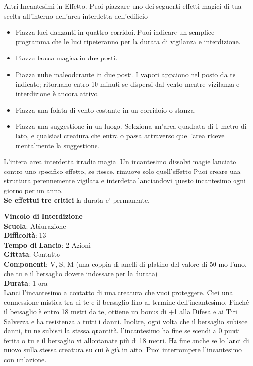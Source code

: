 \begin{multicols}{2}
Altri Incantesimi in Effetto. Puoi piazzare uno dei seguenti effetti magici di tua scelta all'interno dell'area interdetta dell'edificio
\medskip
\begin{itemize}
\item
Piazza luci danzanti in quattro corridoi. Puoi indicare un semplice programma che le luci ripeteranno per la durata di vigilanza e interdizione.
\item
Piazza bocca magica in due posti.
\item
Piazza nube maleodorante in due posti. I vapori appaiono nel posto da te indicato; ritornano entro 10 minuti se dispersi dal vento mentre vigilanza e interdizione è ancora attivo.
\item
Piazza una folata di vento costante in un corridoio o stanza.
\item
Piazza una suggestione in un luogo. Seleziona un'area quadrata di 1 metro di lato, e qualsiasi creatura che entra o passa attraverso quell'area riceve mentalmente la suggestione.
\end{itemize}
\medskip
L'intera area interdetta irradia magia. Un incantesimo dissolvi magie lanciato contro uno specifico effetto, se riesce, rimuove solo quell'effetto Puoi creare una struttura perennemente vigilata e interdetta lanciandovi questo incantesimo ogni giorno per un anno.\\
\textbf{Se effettui tre critici} la durata e' permanente.

\medskip\textbf{Vincolo di Interdizione}\\
\textbf{Scuola}: Abiurazione\\
\textbf{Difficoltà}:  13\\
\textbf{Tempo di Lancio}: 2 Azioni\\
\textbf{Gittata}: Contatto\\
\textbf{Componenti}: V, S, M (una coppia di anelli di platino del valore di 50 mo l’uno, che tu e il bersaglio dovete indossare per la durata)\\
\textbf{Durata}: 1 ora\\
Lanci l'incantesimo a contatto di una creatura che vuoi proteggere. Crei una connessione mistica tra di te e il bersaglio fino al termine dell'incantesimo. Finché il bersaglio è entro 18 metri da te, ottiene un bonus di +1 alla Difesa e ai Tiri Salvezza e ha resistenza a tutti i danni. Inoltre, ogni volta che il bersaglio subisce danni, tu ne subisci la stessa quantità. l'incantesimo ha fine se scendi a 0 punti ferita o tu e il bersaglio vi allontanate più di 18 metri. Ha fine anche se lo lanci di nuovo sulla stessa creatura su cui è già in atto. Puoi interrompere l'incantesimo con un'azione.


\end{multicols}
